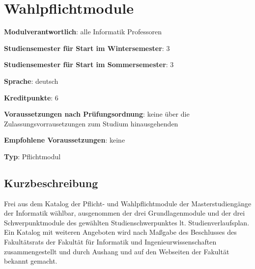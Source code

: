 \chapter{Wahlpflichtmodule\label{/mi-2017/modulbeschreibungen-master/MA_All_Modul_Wahlpflichtmodule}}\label{wahlpflichtmodulepathlabelmi-2017modulbeschreibungen-mastermaux5fallux5fmodulux5fwahlpflichtmodule}

\begin{modulHead}
\textbf{Modulverantwortlich}: alle Informatik
Professoren
\end{modulHead}
\begin{modulHead}
\textbf{Studiensemester
für Start im Wintersemester}:
3
\end{modulHead}
\begin{modulHead}
\textbf{Studiensemester für Start
im Sommersemester}:
3
\end{modulHead}
\begin{modulHead}
\textbf{Sprache}:
deutsch
\end{modulHead}
\begin{modulHead}
\textbf{Kreditpunkte}:
6
\end{modulHead}
\begin{modulHead}
\textbf{Voraussetzungen nach
Prüfungsordnung}: keine über die Zulassungsvorrausetzungen zum Studium
hinausgehenden
\end{modulHead}
\begin{modulHead}
\textbf{Empfohlene
Voraussetzungen}: keine
\end{modulHead}
\begin{modulHead}
\textbf{Typ}:
Pflichtmodul
\end{modulHead}


\section*{Kurzbeschreibung\label{/mi-2017/modulbeschreibungen-master/MA_All_Modul_Wahlpflichtmodule}}\label{kurzbeschreibungpathlabelmi-2017modulbeschreibungen-mastermaux5fallux5fmodulux5fwahlpflichtmodule}

Frei aus dem Katalog der Pflicht- und Wahlpflichtmodule der
Masterstudiengänge der Informatik wählbar, ausgenommen der drei
Grundlagenmodule und der drei Schwerpunktmodule des gewählten
Studienschwerpunktes lt. Studienverlaufsplan. Ein Katalog mit weiteren
Angeboten wird nach Maßgabe des Beschlusses des Fakultätsrats der
Fakultät für Informatik und Ingenieurwissenschaften zusammengestellt und
durch Aushang und auf den Webseiten der Fakultät bekannt gemacht.

